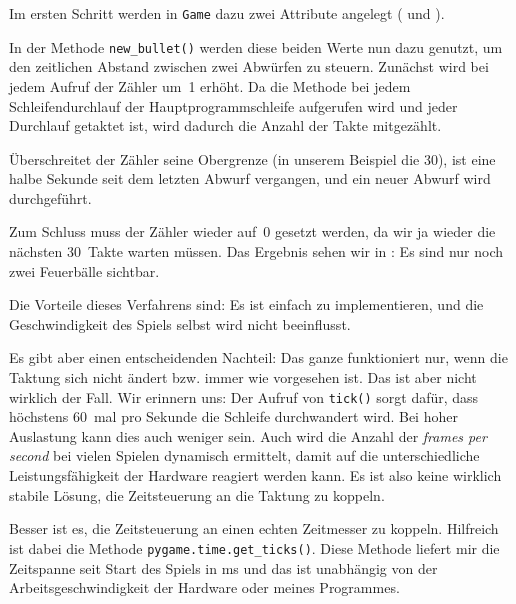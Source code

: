 Im ersten Schritt werden in \texttt{Game} dazu zwei Attribute angelegt ( und ). 



In der Methode \texttt{new\_bullet()} werden diese beiden Werte nun dazu genutzt, um den zeitlichen Abstand zwischen zwei Abwürfen zu steuern. Zunächst wird bei jedem Aufruf der Zähler um~1 erhöht. Da die Methode bei jedem Schleifendurchlauf der Hauptprogrammschleife aufgerufen wird und jeder Durchlauf getaktet ist, wird dadurch die Anzahl der Takte mitgezählt. 

Überschreitet der Zähler seine Obergrenze (in unserem Beispiel die 30), ist eine halbe Sekunde seit dem letzten Abwurf vergangen, und ein neuer Abwurf wird durchgeführt. 

Zum Schluss muss der Zähler wieder auf~0 gesetzt werden, da wir ja wieder die nächsten 30~Takte warten müssen. Das Ergebnis sehen wir in : Es sind nur noch zwei Feuerbälle sichtbar.




Die Vorteile dieses Verfahrens sind: Es ist einfach zu implementieren, und die Geschwindigkeit des Spiels selbst wird nicht beeinflusst. 

Es gibt aber einen entscheidenden Nachteil: Das ganze funktioniert nur, wenn die Taktung sich nicht ändert bzw. immer wie vorgesehen ist. Das ist aber nicht wirklich der Fall. Wir erinnern uns: Der Aufruf von \texttt{tick()} sorgt dafür, dass höchstens 60~mal pro Sekunde die Schleife durchwandert wird. Bei hoher Auslastung kann dies auch weniger sein. Auch wird die Anzahl der \emph{frames per second} bei vielen Spielen dynamisch ermittelt, damit auf die unterschiedliche Leistungsfähigkeit der Hardware reagiert werden kann. Es ist also keine wirklich stabile Lösung, die Zeitsteuerung an die Taktung zu koppeln. 

Besser ist es, die Zeitsteuerung an einen echten Zeitmesser zu koppeln. Hilfreich ist dabei die Methode \texttt{pygame.time.get\_ticks()}. Diese Methode liefert mir die Zeitspanne seit Start des Spiels in \gls{ms} und das ist unabhängig von der Arbeitsgeschwindigkeit der Hardware oder meines Programmes.

